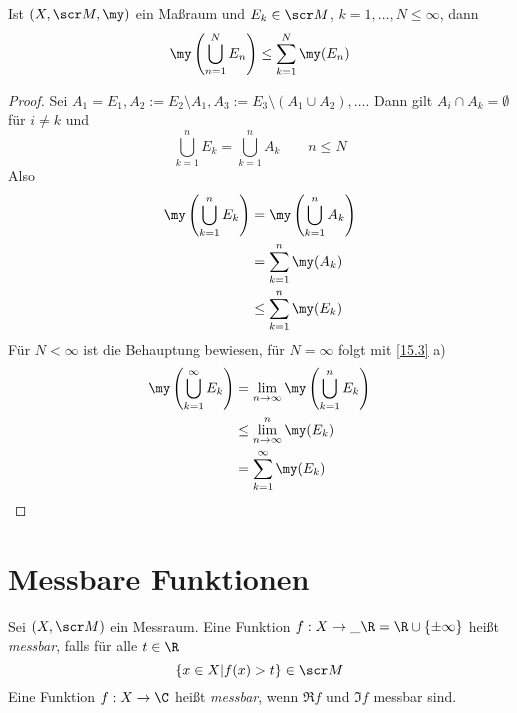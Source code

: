 \documentclass{mycourse}
\begin{document}
\begin{lem}
	\label{15.4}
	Ist $(X,\scr M,\my)$ ein Maßraum und $E_k\in \scr M$, $k=1,\dotsc, N\le \infty$, dann
	\[
		\my\left(\bigcup_{n=1}^N E_n\right) \le \sum_{k=1}^N \my(E_n)
	\]
	\begin{proof}
		Sei $A_1=E_1, A_2 := E_2 \setminus A_1, A_3 := E_3 \setminus (A_1\cup A_2), \dotsc $.
		Dann gilt $A_i \cap A_k = \emptyset$ für $i\neq k$ und
		\[
			\bigcup_{k=1}^n E_k = \bigcup_{k=1}^n A_k \qquad n\le N
		\]
		Also
		\begin{align*}
		\my\left(\bigcup_{k=1}^n E_k\right) &= \my\left( \bigcup_{k=1}^n A_k\right)\\
																														&=\sum_{k=1}^n \my(A_k) \\
									   &\le \sum_{k=1}^n \my(E_k)
		\end{align*}
		Für $N< \infty$ ist die Behauptung bewiesen, für $N=\infty$ folgt mit \ref{15.3} a)
		\begin{align*}
			\my\left(\bigcup_{k=1}^\infty E_k\right) &= \lim_{n\to\infty}\my\left(\bigcup_{k=1}^n E_k\right) \\
																								   &\le \lim_{n\to \infty}^n\my(E_k) \\
									&=\sum_{k=1}^\infty \my(E_k)
		\end{align*}
	\end{proof}
\end{lem}


\section{Messbare Funktionen}

\begin{df*}
	Sei $(X,\scr M)$ ein Messraum.
	Eine Funktion $f: X\to \_\R = \R\cup \{\pm \infty\}$ heißt \emph{messbar}, falls für alle $t\in \R$
	\[
		\{x\in X|f(x)>t\} \in \scr M
	\]
	Eine Funktion $f:X\to \C$ heißt \emph{messbar}, wenn $\Re f$ und $\Im f$ messbar sind.
\end{df*}
\end{document}
